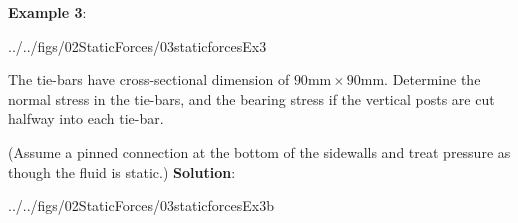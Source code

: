 \documentclass[10pt,onesided]{amsart}
\begin{document}
\newpage

\begin{minipage}{0.4\textwidth}
	\raggedright
	\textbf{Example 3}:\\
	\vspace*{-1cm}
	\begin{cfig}[0.6]{../../figs/02StaticForces/03staticforcesEx3}\end{cfig}
	The tie-bars have cross-sectional dimension of $90\text{mm}\times 90\text{mm}$.
	Determine the normal stress in the tie-bars, and the bearing stress
	if the vertical posts are cut halfway into each tie-bar.		\par
	(Assume a pinned connection at the bottom of the sidewalls and treat pressure as though the fluid is static.)
	\parb
	\textbf{Solution}:
	\parb
	\begin{cfig}[0.6]{../../figs/02StaticForces/03staticforcesEx3b}\end{cfig}
\end{minipage}
\hfill
\end{document}
